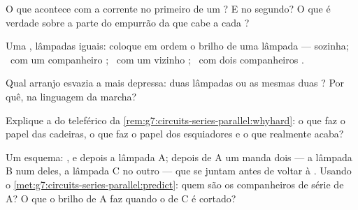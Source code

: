 \begin{exercise}[$\star$]\label{exo:g7:circuits-series-parallel:5}
O que acontece com a corrente no primeiro  de um ? E no segundo? O que é verdade sobre a parte do empurrão da
 que cabe a cada ?
\end{exercise}

\begin{exercise}[$\star$]\label{exo:g7:circuits-series-parallel:6}
Uma , lâmpadas iguais: coloque em ordem o brilho de uma lâmpada
--- sozinha; \ com um companheiro ; \ com um vizinho ; \ com dois companheiros .
\end{exercise}

\begin{exercise}[$\star$]\label{exo:g7:circuits-series-parallel:7}
Qual arranjo esvazia a  mais depressa: duas lâmpadas  ou
as mesmas duas ? Por quê, na linguagem da marcha?
\end{exercise}

\begin{exercise}[$\star$]\label{exo:g7:circuits-series-parallel:8}
Explique a  do teleférico da
\cref{rem:g7:circuits-series-parallel:whyhard}: o que faz o papel das
cadeiras, o que faz o papel dos esquiadores e o que realmente acaba?
\end{exercise}

\begin{exercise}[$\star\star$]\label{exo:g7:circuits-series-parallel:9}
Um esquema: ,  e depois a lâmpada A; depois de A um
 manda dois  --- a lâmpada B num deles, a lâmpada C no outro
--- que se juntam antes de voltar à . Usando o
\cref{met:g7:circuits-series-parallel:predict}: quem são os
companheiros de série de A? O que o brilho de A faz quando o  de
C é cortado?
\end{exercise}

